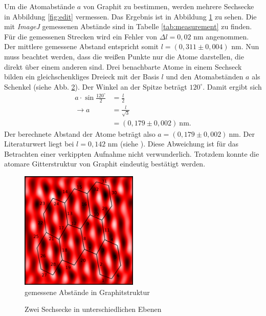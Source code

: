 Um die Atomabstände $a$ von Graphit zu bestimmen, werden mehrere Sechsecke in Abbildung \ref{fig:edit} vermessen. Das Ergebnis ist in Abbildung \ref{fig:measurement} zu sehen. Die mit \textit{ImageJ} gemessenen Abstände sind in Tabelle \ref{tab:measurement} zu finden. Für die gemessenen Strecken wird ein Fehler von $\Delta l=0,02$ nm angenommen. Der mittlere gemessene Abstand entspricht somit $l=(0,311 \pm 0,004)$ nm. 
Nun muss beachtet werden, dass die weißen Punkte nur die Atome darstellen, die direkt über einem anderen sind. Drei benachbarte Atome in einem Sechseck bilden ein gleichschenkliges Dreieck mit der Basis $l$ und den Atomabständen $a$ als Schenkel (siehe Abb. \ref{fig:triangle}). Der Winkel an der Spitze beträgt $120^\circ$. Damit ergibt sich
\begin{align*}
a\cdot\sin{\frac{120^\circ}{2}} &= \frac{l}{2}\\
\rightarrow a &= \frac{l}{\sqrt{3}}\\
  &= (0,179 \pm 0,002) \ \mathrm{nm}.
\end{align*} Der berechnete Abstand der Atome beträgt also $a = (0,179 \pm 0,002) \ \si{\nano\metre}$. Der Literaturwert liegt bei $l=0,142$ nm (siehe \cite{graphit}). Diese Abweichung ist für das Betrachten einer verkippten Aufnahme nicht verwunderlich. Trotzdem konnte die atomare Gitterstruktur von Graphit eindeutig bestätigt werden.

\begin{figure}[h]
  \centering
  \includegraphics[width=0.5\textwidth]{data/graphit_kilian/measurement_final.png}
  \caption{gemessene Abstände in Graphitstruktur}
  \label{fig:measurement}
\end{figure}

\begin{figure}[h]
\centering

\caption{Zwei Sechsecke in unterschiedlichen Ebenen}
\label{fig:triangle}
\end{figure}


